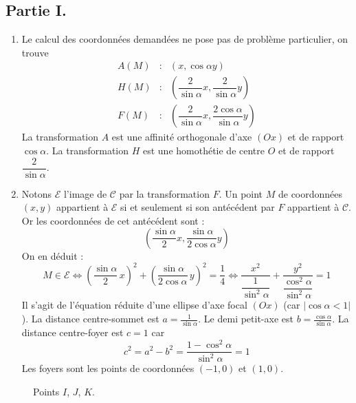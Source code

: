 \subsection*{Partie I.}
\begin{enumerate}
 \item Le calcul des coordonnées demandées ne pose pas de problème particulier, on trouve
\begin{align*}
 A(M) &: &(x, \cos \alpha y)\\ 
H(M) &: &\left( \dfrac{2}{\sin \alpha}x , \dfrac{2}{\sin \alpha} y\right) \\
F(M) &: &\left( \dfrac{2}{\sin \alpha}x , \dfrac{2\cos \alpha }{\sin \alpha} y\right)
\end{align*}
La transformation $A$ est une affinité orthogonale d'axe $(Ox)$ et de rapport $\cos \alpha$. La transformation $H$ est une homothétie de centre $O$ et de rapport $\dfrac{2}{\sin \alpha}$.
\item Notons $\mathcal E$ l'image de $\mathcal C$ par la transformation $F$. Un point $M$ de coordonnées $(x,y)$ appartient à $\mathcal E$ si et seulement si son antécédent par $F$ appartient à $\mathcal C$. Or les coordonnées de cet antécédent sont :
\begin{displaymath}
 \left( \dfrac{\sin \alpha}{2}x , \dfrac{\sin \alpha}{2\cos \alpha}y\right) 
\end{displaymath}
On en déduit :
\begin{displaymath}
 M\in \mathcal E \Leftrightarrow 
\left( \dfrac{\sin \alpha}{2}\,x\right)^2+\left(\dfrac{\sin \alpha}{2\cos \alpha}\,y\right)^2 = \dfrac{1}{4}
\Leftrightarrow 
\dfrac{x^2}{\dfrac{1}{\sin^2 \alpha}} + \dfrac{y^2}{\dfrac{\cos^2 \alpha}{\sin^2 \alpha}} = 1
\end{displaymath}
Il s'agit de l'équation réduite d'une ellipse d'axe focal $(Ox)$ (car $|\cos \alpha <1|$). La distance centre-sommet est $a=\frac{1}{\sin \alpha}$. Le demi petit-axe est $b=\frac{\cos \alpha}{\sin \alpha}$. La distance centre-foyer est $c=1$ car
\begin{displaymath}
 c^2 = a^2 -b^2 = \dfrac{1-\cos^2 \alpha}{\sin ^2 \alpha} = 1
\end{displaymath}
Les foyers sont les points de coordonnées $(-1,0)$ et $(1,0)$.
\end{enumerate}
\begin{figure}[ht]
 \centering

\caption{Points $I$, $J$, $K$.}
\label{fig:Cvdb_1}
\end{figure}

